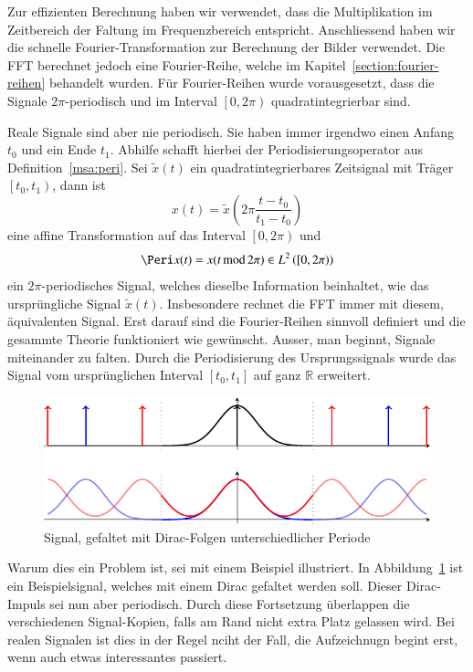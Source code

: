 
Zur effizienten Berechnung haben wir verwendet, dass die Multiplikation im Zeitbereich der Faltung im Frequenzbereich entspricht.
Anschliessend haben wir die schnelle Fourier-Transformation zur Berechnung der Bilder verwendet.
Die FFT berechnet jedoch eine Fourier-Reihe, welche im Kapitel~\ref{section:fourier-reihen} behandelt wurden.
Für Fourier-Reihen wurde vorausgesetzt, dass die Signale $2\pi$-periodisch und im Interval $\left[0, 2\pi\right)$ quadratintegrierbar sind.

Reale Signale sind aber nie periodisch.
Sie haben immer irgendwo einen Anfang $t_0$ und ein Ende $t_1$.
Abhilfe schafft hierbei der Periodisierungsoperator aus Definition~\ref{msa:peri}.
Sei $\tilde{x}(t)$ ein quadratintegrierbares Zeitsignal mit Träger $\left[t_0, t_1\right)$, dann ist
\[
	x(t) = \tilde{x}\left(2\pi\frac{t-t_0}{t_1-t_0}\right)
\]
eine affine Transformation auf das Interval $\left[0, 2\pi \right)$ und
\[
	\Peri x(t) = x( t \,\text{mod}\, 2\pi) \in L^2\left(\left[0, 2\pi \right)\right)
\]
ein $2\pi$-periodisches Signal, welches dieselbe Information beinhaltet, wie das ursprüngliche Signal $\tilde{x}(t)$.
Insbesondere rechnet die FFT immer mit diesem, äquivalenten Signal.
Erst darauf sind die Fourier-Reihen sinnvoll definiert und die gesammte Theorie funktioniert wie gewünscht.
Ausser, man beginnt, Signale miteinander zu falten.
Durch die Periodisierung des Ursprungssignals wurde das Signal vom ursprünglichen Interval $[t_0, t_1]$ auf ganz $\mathbb{R}$ erweitert.

\begin{figure}
	\centering
	\includegraphics{papers/complex/images/cyclic_conv.pdf}
	\caption{Signal, gefaltet mit Dirac-Folgen unterschiedlicher Periode}
	\label{complex:cyclic-conv}
\end{figure}
Warum dies ein Problem ist, sei mit einem Beispiel illustriert.
In Abbildung~\ref{complex:cyclic-conv} ist ein Beispielsignal, welches mit einem Dirac gefaltet werden soll.
Dieser Dirac-Impuls sei nun aber periodisch.
Durch diese Fortsetzung überlappen die verschiedenen Signal-Kopien, falls am Rand nicht extra Platz gelassen wird.
Bei realen Signalen ist dies in der Regel nciht der Fall, die Aufzeichnugn begint erst, wenn auch etwas interessantes passiert.

